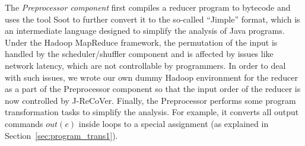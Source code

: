 \documentclass{llncs}
\begin{document}
The \emph{Preprocessor component} first compiles a reducer program to bytecode
and uses the tool Soot to further convert it to the so-called ``Jimple'' format,
which is an intermediate language designed to simplify the analysis of Java
programs. Under the Hadoop MapReduce framework, the permutation of the input is
handled by the scheduler/shuffler component and is affected by issues like
network latency, which are not controllable by programmers. In order to deal
with such issues, we wrote our own dummy Hadoop environment for the reducer as a
part of the Preprocessor component so that the input order of the reducer is now
controlled by J-ReCoVer. Finally, the Preprocessor performs some program
transformation tasks to simplify the analysis. For example, it converts all
output commands $out(e)$ inside loops to a special assignment (as explained in
Section~\ref{sec:program_trans1}).
\end{document}
